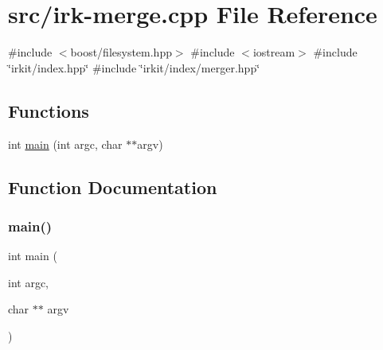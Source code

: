 \hypertarget{irk-merge_8cpp}{}\section{src/irk-\/merge.cpp File Reference}
\label{irk-merge_8cpp}
{\ttfamily \#include $<$boost/filesystem.\+hpp$>$}\newline
{\ttfamily \#include $<$iostream$>$}\newline
{\ttfamily \#include \char`\"{}irkit/index.\+hpp\char`\"{}}\newline
{\ttfamily \#include \char`\"{}irkit/index/merger.\+hpp\char`\"{}}\newline
\subsection*{Functions}
\begin{DoxyCompactItemize}
\item 
int \mbox{\hyperlink{irk-merge_8cpp_a3c04138a5bfe5d72780bb7e82a18e627}{main}} (int argc, char $\ast$$\ast$argv)
\end{DoxyCompactItemize}


\subsection{Function Documentation}
\mbox{\label{irk-merge_8cpp_a3c04138a5bfe5d72780bb7e82a18e627}} 
\subsubsection{\texorpdfstring{main()}{main()}}
{\footnotesize\ttfamily int main (\begin{DoxyParamCaption}\item[{int}]{argc,  }\item[{char $\ast$$\ast$}]{argv }\end{DoxyParamCaption})}

